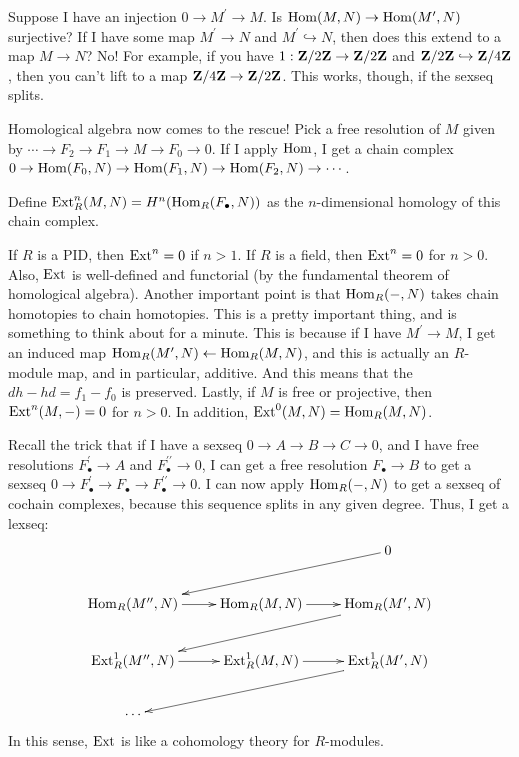 Suppose I have an injection $0\to M^\prime\to M$. Is $\operatorname{Hom}(M,N)\to\operatorname{Hom}(M^\prime,N)$ surjective? If I have some map $M^\prime\to N$ and $M^\prime\hookrightarrow N$, then does this extend to a map $M\to N$? No! For example, if you have $1:\mathbf Z/2\mathbf Z\to\mathbf Z/2\mathbf Z$ and $\mathbf Z/2\mathbf Z\hookrightarrow\mathbf Z/4\mathbf Z$, then you can't lift to a map $\mathbf Z/4\mathbf Z\to\mathbf Z/2\mathbf Z$. This works, though, if the sexseq splits.

Homological algebra now comes to the rescue! Pick a free resolution of $M$ given by $\cdots\to F_2\to F_1\to M\to F_0\to 0$. If I apply $\operatorname{Hom}$, I get a chain complex $0\to \operatorname{Hom}(F_0,N)\to \operatorname{Hom}(F_1,N)\to \operatorname{Hom}(F_2,N)\to\cdots$.
\begin{definition}
Define $\operatorname{Ext}_R^n(M,N)= H^n(\operatorname{Hom}_R(F_\bullet,N))$ as the $n$-dimensional homology of this chain complex.
\end{definition}
\begin{remark}
If $R$ is a PID, then $\operatorname{Ext}^n=0$ if $n>1$. If $R$ is a field, then $\operatorname{Ext}^n=0$ for $n>0$. Also, $\operatorname{Ext}$ is well-defined and functorial (by the fundamental theorem of homological algebra). Another important point is that $\operatorname{Hom}_R(-,N)$ takes chain homotopies to chain homotopies. This is a pretty important thing, and is something to think about for a minute. This is because if I have $M^\prime\to M$, I get an induced map $\operatorname{Hom}_R(M^\prime,N)\leftarrow\operatorname{Hom}_R(M,N)$, and this is actually an $R$-module map, and in particular, additive. And this means that the $dh-hd=f_1-f_0$ is preserved. Lastly, if $M$ is free or projective, then $\operatorname{Ext}^n(M,-)=0$ for $n>0$. In addition, $\operatorname{Ext}^0(M,N)=\operatorname{Hom}_R(M,N)$.
\end{remark}
Recall the trick that if I have a sexseq $0\to A\to B\to C\to 0$, and I have free resolutions $F^\prime_\bullet\to A$ and $F^{\prime\prime}_\bullet\to 0$, I can get a free resolution $F_\bullet\to B$ to get a sexseq $0\to F^\prime_\bullet\to F_\bullet\to F^{\prime\prime}_\bullet\to 0$. I can now apply $\operatorname{Hom}_R(-,N)$ to get a sexseq of cochain complexes, because this sequence splits in any given degree. Thus, I get a lexseq:
\begin{equation*}
\xymatrix{ & & 0\ar[dll]\\
\Hom_R(M^{\prime\prime},N)\ar[r] & \Hom_R(M,N)\ar[r] & \Hom_R(M^{\prime},N)\ar[dll]\\
\Ext^1_R(M^{\prime\prime},N)\ar[r] & \Ext^1_R(M,N)\ar[r] & \Ext^1_R(M^{\prime},N)\ar[dll]\\
\cdots & &}
\end{equation*}
In this sense, $\operatorname{Ext}$ is like a cohomology theory for $R$-modules.

